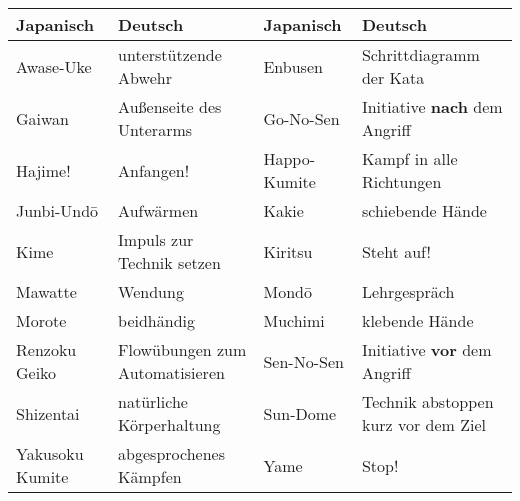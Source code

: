 \begin{tcolorbox}[colframe=lightgray,colback=white,coltitle=black,title=Allgemeines:\indent weitere Begriffe aus dem Japanischen]
	\begin{tabularx}{\linewidth}{lXlX}%
		Japanisch	& Deutsch	& Japanisch&Deutsch\\
		\midrule
		Awase-Uke&	unterstützende Abwehr	&	Enbusen	&	Schrittdiagramm der Kata\\
		Gaiwan	& Außenseite des Unterarms	&	Go-No-Sen	&	Initiative \textbf{nach} dem Angriff\\
		Hajime!&	Anfangen!	&	Happo-Kumite	& Kampf in alle Richtungen\\
		Junbi-Und\={o}	& Aufwärmen	&	Kakie	& schiebende Hände\\
		Kime	&	Impuls zur Technik setzen	& Kiritsu & Steht auf!\\
		Mawatte	& Wendung&	Mond\={o}& Lehrgespräch\\
		Morote	& beidhändig	& Muchimi & klebende Hände\\
		Renzoku Geiko	& Flowübungen zum Automatisieren & Sen-No-Sen & Initiative \textbf{vor} dem Angriff\\
		Shizentai	& natürliche Körperhaltung&Sun-Dome & Technik abstoppen  kurz vor dem Ziel\\
		Yakusoku Kumite & abgesprochenes Kämpfen & Yame	& Stop!\\
	\end{tabularx}
\end{tcolorbox}
